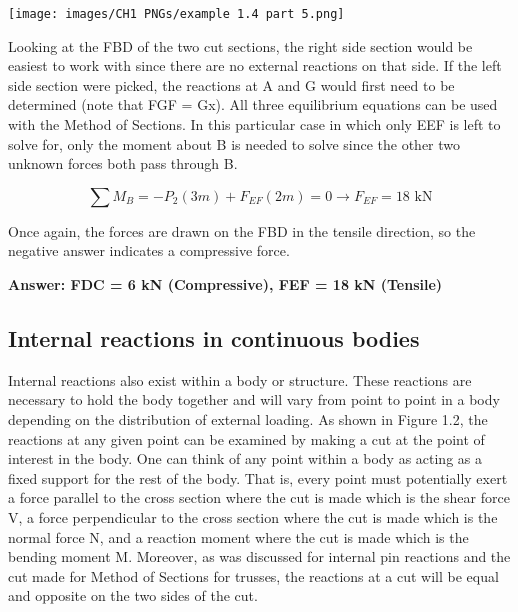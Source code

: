 \documentclass[
  letterpaper,
  DIV=11,
  numbers=noendperiod]{scrreprt}
\begin{document}
\begin{tcolorbox}
\begin{center}
\texttt{[image: images/CH1 PNGs/example 1.4 part 5.png]}
\end{center}

Looking at the FBD of the two cut sections, the right side section would
be easiest to work with since there are no external reactions on that
side. If the left side section were picked, the reactions at A and G
would first need to be determined (note that FGF = Gx). All three
equilibrium equations can be used with the Method of Sections. In this
particular case in which only EEF is left to solve for, only the moment
about B is needed to solve since the other two unknown forces both pass
through B.

\[
\sum M_B=-P_2(3 m)+F_{E F}(2 m)=0 \rightarrow F_{E F}=18 \text{ kN}
\]

Once again, the forces are drawn on the FBD in the tensile direction, so
the negative answer indicates a compressive force.

\textbf{Answer: FDC = 6 kN (Compressive), FEF = 18 kN (Tensile)}

\end{tcolorbox}

\subsection{Internal reactions in continuous
bodies}\label{internal-reactions-in-continuous-bodies}

Internal reactions also exist within a body or structure. These
reactions are necessary to hold the body together and will vary from
point to point in a body depending on the distribution of external
loading. As shown in Figure 1.2, the reactions at any given point can be
examined by making a cut at the point of interest in the body. One can
think of any point within a body as acting as a fixed support for the
rest of the body. That is, every point must potentially exert a force
parallel to the cross section where the cut is made which is the shear
force V, a force perpendicular to the cross section where the cut is
made which is the normal force N, and a reaction moment where the cut is
made which is the bending moment M. Moreover, as was discussed for
internal pin reactions and the cut made for Method of Sections for
trusses, the reactions at a cut will be equal and opposite on the two
sides of the cut.
\end{document}
